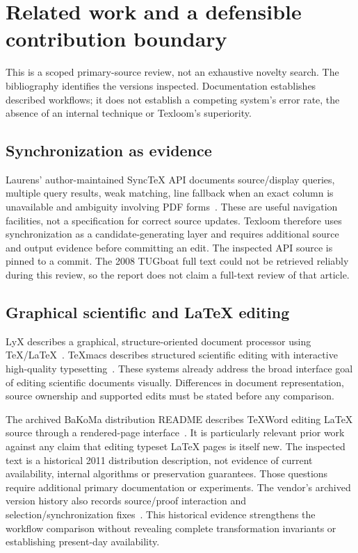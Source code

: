 \section{Related work and a defensible contribution boundary}
This is a scoped primary-source review, not an exhaustive novelty search.
The bibliography identifies the versions inspected. Documentation establishes
described workflows; it does not establish a competing system's error rate,
the absence of an internal technique or Texloom's superiority.

\subsection{Synchronization as evidence}
Laurens' author-maintained SyncTeX API documents source/display queries,
multiple query results, weak matching, line fallback when an exact column is
unavailable and ambiguity involving PDF forms~\cite{synctex}. These are useful
navigation facilities, not a specification for correct source updates.
Texloom therefore uses synchronization as a candidate-generating layer and
requires additional source and output evidence before committing an edit.
The inspected API source is pinned to a commit. The 2008 TUGboat full text
could not be retrieved reliably during this review, so the report does not
claim a full-text review of that article.

\subsection{Graphical scientific and LaTeX editing}
LyX describes a graphical, structure-oriented document processor using
TeX/LaTeX~\cite{lyx}. TeXmacs describes structured scientific editing with
interactive high-quality typesetting~\cite{texmacs}. These systems already
address the broad interface goal of editing scientific documents visually.
Differences in document representation, source ownership and supported edits
must be stated before any comparison.

The archived BaKoMa distribution README describes TeXWord editing LaTeX source
through a rendered-page interface~\cite{bakoma}. It is particularly relevant
prior work against any claim that editing typeset LaTeX pages is itself new.
The inspected text is a historical 2011 distribution description, not evidence
of current availability, internal algorithms or preservation guarantees.
Those questions require additional primary documentation or experiments.
The vendor's archived version history also records source/proof interaction
and selection/synchronization fixes~\cite{bakomahistory}. This historical
evidence strengthens the workflow comparison without revealing complete
transformation invariants or establishing present-day availability.

